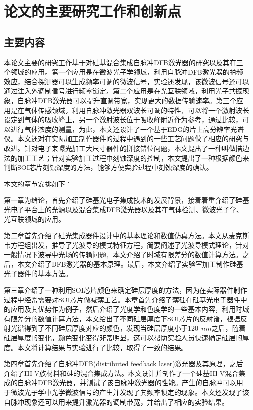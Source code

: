 \section{论文的主要研究工作和创新点}
\subsection{主要内容}

本论文主要的研究工作基于对硅基混合集成自脉冲DFB激光器的研究以及其在三个领域的应用。第一个应用是在微波光子学领域，利用自脉冲DFB激光器的拍频效应，结合探测器可以生成频率可调的微波信号，实验还发现，该微波信号还可以通过注入外调制信号进行频率锁定。第二个应用是在光互联领域，利用光子共振现象，自脉冲DFB激光器可以提升直调带宽，实现更大的数据传输速率。第三个应用是在气体传感领域，利用自脉冲激光器双波长可调的特性，可以将一个激射波长设定到气体的吸收峰上，另一个激射波长位于吸收峰附近作为参考，通过比较，可以进行气体浓度的测量，为此，本文还设计了一个基于EDG的片上高分辨率光谱仪。本文还对在实际加工制作器件的过程中遇到的一些工艺问题做了相应的研究与改进。针对电子束曝光加工大尺寸器件的拼接错位问题，本文提出了一种叫做描边法的加工工艺；针对实验加工过程中刻蚀深度的控制，本文提出了一种根据颜色来判断SOI芯片刻蚀深度的方法，能够方便实验过程中刻蚀深度的确认。

本文的章节安排如下：

第一章为绪论，首先介绍了硅基光电子集成技术的发展背景，接着着重介绍了硅基光电子平台上的光源以及混合集成DFB激光器以及其在气体检测、微波光子学、光互联领域的应用。

第二章首先介绍了硅光集成器件设计中的基本理论和数值仿真方法。本文从麦克斯韦方程组出发，推导了光波导的模式特征方程，简要阐述了光波导模式理论，针对一般情况下波导中光场的传输问题，本文介绍了时域有限差分的数值计算方法。之后，本文介绍了DFB激光器的基本原理。最后，本文介绍了实验室加工制作硅基光子器件的基本方法。

第三章介绍了一种利用SOI芯片颜色来确定硅层厚度的方法，因为在实际器件制作过程中经常需要对SOI芯片做减薄工艺。本章首先介绍了薄硅在硅基光电子器件中的应用及其优势作为例子，然后介绍了光度学和色度学的一些基本内容，利用时域有限差分的数值计算方法，本文给出了不同硅层厚度下SOI芯片的反射谱，根据反射光谱得到了不同硅层厚度对应的颜色，发现当硅层厚度小于120~$nm$之后，随着硅层厚度的变化，颜色变化变得非常明显，这可以帮助实验人员快速确定硅层的厚度。本文将计算结果与实验进行了比较，取得了一致的结果。

第四章首先介绍了自脉冲DFB(distributed feedback laser)激光器及其原理，之后介绍了III-V族材料和硅的混合集成方法。本文设计并制作了一个硅基III-V混合集成的自脉冲DFB激光器，并测试了该自脉冲激光器的性能。产生的自脉冲可以用于微波光子学中光学微波信号的产生并发现了其频率锁定的现象。本文还发现了该自脉冲现象还可以用来提升激光器的调制带宽，并给出了相应的实验结果。

